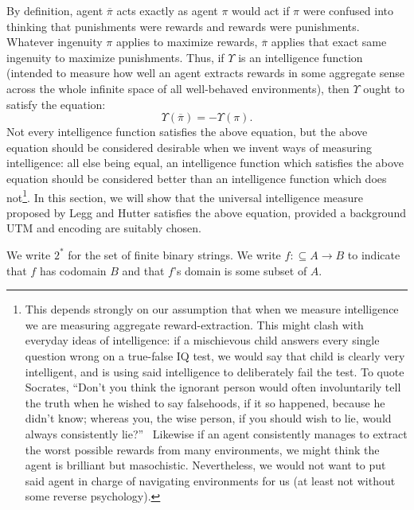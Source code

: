 \documentclass{article}
\begin{document}
By definition, agent $\overline\pi$ acts exactly as agent $\pi$ would
act if $\pi$ were confused into thinking that punishments were rewards
and rewards were punishments.
Whatever ingenuity $\pi$ applies to maximize rewards,
$\overline\pi$ applies that exact same ingenuity to maximize punishments.
Thus, if $\Upsilon$ is an intelligence function (intended to measure how
well an agent extracts rewards in some aggregate sense across the whole
infinite space of all well-behaved environments), then $\Upsilon$ ought
to satisfy the equation:
\[
    \Upsilon(\overline\pi) = -\Upsilon(\pi).
\]
Not every intelligence function satisfies the above equation, but the
above equation should be considered desirable when we
invent ways of measuring intelligence: all else being equal, an
intelligence function which satisfies the above equation should be
considered better than an intelligence function which does
not\footnote{This depends strongly on our assumption that when we
measure intelligence we are measuring aggregate reward-extraction. This might clash
with everyday ideas of intelligence: if a mischievous child answers every single
question wrong on a true-false IQ test, we would say that child is clearly very
intelligent, and is using said intelligence to deliberately fail the test.
To quote Socrates, ``Don't you think the ignorant person would often involuntarily
tell the truth when he wished to say falsehoods, if it so happened, because he
didn't know; whereas you, the wise person, if you should wish to lie,
would always consistently lie?''\ \cite{lesserhippias}
Likewise if an agent consistently manages to extract the worst possible rewards
from many environments, we might think the agent is brilliant but
masochistic.
Nevertheless, we would not want to put said agent
in charge of navigating environments for us (at least not without some
reverse psychology).}.
In this section, we will show that the universal intelligence measure
proposed by Legg and Hutter satisfies the above equation, provided a
background UTM and encoding are suitably chosen.

We write $2^*$ for the set of finite binary strings.
We write $f:\subseteq A\to B$ to indicate that $f$ has codomain $B$
and that $f$'s domain is some subset of $A$.
\end{document}
